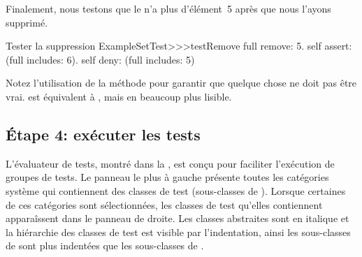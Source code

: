 \documentclass[a4paper,10pt,twoside]{book}
\begin{document}
Finalement, nous testons que le  n'a plus d'élément~5 après que nous l'ayons supprimé.

\begin{method}[testRemove]{Tester la suppression}
ExampleSetTest>>>testRemove
	full remove: 5.
	self assert: (full includes: 6).
	self deny: (full includes: 5)
\end{method}

\noindent
Notez l'utilisation de la méthode  pour garantir que quelque chose ne doit pas être vrai.
 est équivalent à , mais en beaucoup plus lisible.
\subsection{\'Etape 4: exécuter les tests}
L'évaluateur de tests, montré dans la , est conçu pour faciliter l'exécution de groupes de tests.
Le panneau le plus à gauche présente toutes les catégories système qui contiennent des classes de test (\ie  sous-classes de ). Lorsque certaines de ces catégories sont sélectionnées, les classes de test qu'elles contiennent apparaîssent dans le panneau de droite. Les classes abstraites sont en italique et la hiérarchie des classes de test est visible par l'indentation, ainsi les sous-classes de   sont plus indentées que les sous-classes de .
\end{document}
